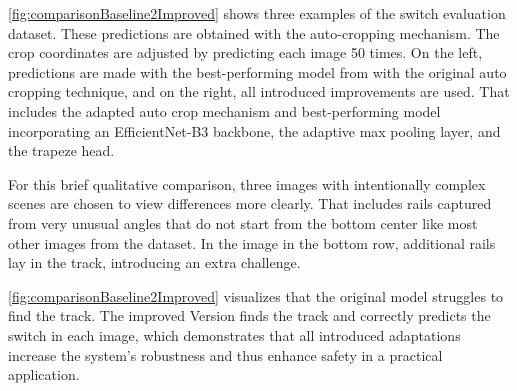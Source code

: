 \autoref{fig:comparisonBaseline2Improved} shows three examples of the switch evaluation dataset.
These predictions are obtained with the auto-cropping mechanism.
The crop coordinates are adjusted by predicting each image 50 times.
On the left, predictions are made with the best-performing model from \cite{tepNet2024} with the original auto cropping technique, and on the right, all introduced improvements are used.
That includes the adapted auto crop mechanism and best-performing model incorporating an EfficientNet-B3 backbone, the adaptive max pooling layer, and the trapeze head.

For this brief qualitative comparison, three images with intentionally complex scenes are chosen to view differences more clearly.
That includes rails captured from very unusual angles that do not start from the bottom center like most other images from the dataset.
In the image in the bottom row, additional rails lay in the track, introducing an extra challenge.

\autoref{fig:comparisonBaseline2Improved} visualizes that the original model \cite{tepNet2024} struggles to find the track.
The improved Version finds the track and correctly predicts the switch in each image, which demonstrates that all introduced adaptations increase the system's robustness and thus enhance safety in a practical application.

